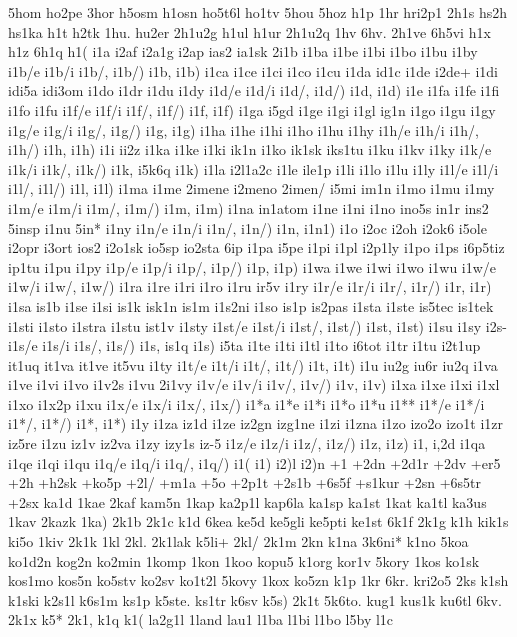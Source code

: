 {{5hom
ho2pe
3hor
h5osm
h1osn
ho5t6l
ho1tv
5hou
5hoz
h1p
1hr
hri2p1
2h1s
hs2h
hs1ka
h1t
h2tk
1hu.
hu2er
2h1u2g
h1ul
h1ur
2h1u2q
1hv
6hv.
2h1ve
6h5vi
h1x
h1z
6h1q
h1(
i1a
i2af
i2a1g
i2ap
ias2
ia1sk
2i1b
i1ba
i1be
i1bi
i1bo
i1bu
i1by
i1b/e
i1b/i
i1b/,
i1b/)
i1b,
i1b)
i1ca
i1ce
i1ci
i1co
i1cu
i1da
id1c
i1de
i2de+
i1di
idi5a
idi3om
i1do
i1dr
i1du
i1dy
i1d/e
i1d/i
i1d/,
i1d/)
i1d,
i1d)
i1e
i1fa
i1fe
i1fi
i1fo
i1fu
i1f/e
i1f/i
i1f/,
i1f/)
i1f,
i1f)
i1ga
i5gd
i1ge
i1gi
i1gl
ig1n
i1go
i1gu
i1gy
i1g/e
i1g/i
i1g/,
i1g/)
i1g,
i1g)
i1ha
i1he
i1hi
i1ho
i1hu
i1hy
i1h/e
i1h/i
i1h/,
i1h/)
i1h,
i1h)
i1i
ii2z
i1ka
i1ke
i1ki
ik1n
i1ko
ik1sk
iks1tu
i1ku
i1kv
i1ky
i1k/e
i1k/i
i1k/,
i1k/)
i1k,
i5k6q
i1k)
i1la
i2l1a2c
i1le
ile1p
i1li
i1lo
i1lu
i1ly
i1l/e
i1l/i
i1l/,
i1l/)
i1l,
i1l)
i1ma
i1me
2imene
i2meno
2imen/
i5mi
im1n
i1mo
i1mu
i1my
i1m/e
i1m/i
i1m/,
i1m/)
i1m,
i1m)
i1na
in1atom
i1ne
i1ni
i1no
ino5s
in1r
ins2
5insp
i1nu
5in*
i1ny
i1n/e
i1n/i
i1n/,
i1n/)
i1n,
i1n1)
i1o
i2oc
i2oh
i2ok6
i5ole
i2opr
i3ort
ios2
i2o1sk
io5sp
io2sta
6ip
i1pa
i5pe
i1pi
i1pl
i2p1ly
i1po
i1ps
i6p5tiz
ip1tu
i1pu
i1py
i1p/e
i1p/i
i1p/,
i1p/)
i1p,
i1p)
i1wa
i1we
i1wi
i1wo
i1wu
i1w/e
i1w/i
i1w/,
i1w/)
i1ra
i1re
i1ri
i1ro
i1ru
ir5v
i1ry
i1r/e
i1r/i
i1r/,
i1r/)
i1r,
i1r)
i1sa
is1b
i1se
i1si
is1k
isk1n
is1m
i1s2ni
i1so
is1p
is2pas
i1sta
i1ste
is5tec
is1tek
i1sti
i1sto
i1stra
i1stu
ist1v
i1sty
i1st/e
i1st/i
i1st/,
i1st/)
i1st,
i1st)
i1su
i1sy
i2s-
i1s/e
i1s/i
i1s/,
i1s/)
i1s,
is1q
i1s)
i5ta
i1te
i1ti
i1tl
i1to
i6tot
i1tr
i1tu
i2t1up
it1uq
it1va
it1ve
it5vu
i1ty
i1t/e
i1t/i
i1t/,
i1t/)
i1t,
i1t)
i1u
iu2g
iu6r
iu2q
i1va
i1ve
i1vi
i1vo
i1v2s
i1vu
2i1vy
i1v/e
i1v/i
i1v/,
i1v/)
i1v,
i1v)
i1xa
i1xe
i1xi
i1xl
i1xo
i1x2p
i1xu
i1x/e
i1x/i
i1x/,
i1x/)
i1*a
i1*e
i1*i
i1*o
i1*u
i1**
i1*/e
i1*/i
i1*/,
i1*/)
i1*,
i1*)
i1y
i1za
iz1d
i1ze
iz2gn
izg1ne
i1zi
i1zna
i1zo
izo2o
izo1t
i1zr
iz5re
i1zu
iz1v
iz2va
i1zy
izy1s
iz-5
i1z/e
i1z/i
i1z/,
i1z/)
i1z,
i1z)
i1,
i,2d
i1qa
i1qe
i1qi
i1qu
i1q/e
i1q/i
i1q/,
i1q/)
i1(
i1)
i2)l
i2)n
+1
+2dn
+2d1r
+2dv
+er5
+2h
+h2sk
+ko5p
+2l/
+m1a
+5o
+2p1t
+2s1b
+6s5f
+s1kur
+2sn
+6s5tr
+2sx
ka1d
1kae
2kaf
kam5n
1kap
ka2p1l
kap6la
ka1sp
ka1st
1kat
ka1tl
ka3us
1kav
2kazk
1ka)
2k1b
2k1c
k1d
6kea
ke5d
ke5gli
ke5pti
ke1st
6k1f
2k1g
k1h
kik1s
ki5o
1kiv
2k1k
1kl
2kl.
2k1lak
k5li+
2kl/
2k1m
2kn
k1na
3k6ni*
k1no
5koa
ko1d2n
kog2n
ko2min
1komp
1kon
1koo
kopu5
k1org
kor1v
5kory
1kos
ko1sk
kos1mo
kos5n
ko5stv
ko2sv
ko1t2l
5kovy
1kox
ko5zn
k1p
1kr
6kr.
kri2o5
2ks
k1sh
k1ski
k2s1l
k6s1m
ks1p
k5ste.
ks1tr
k6sv
k5s)
2k1t
5k6to.
kug1
kus1k
ku6tl
6kv.
2k1x
k5*
2k1,
k1q
k1(
la2g1l
1land
lau1
l1ba
l1bi
l1bo
l5by
l1c
}}
